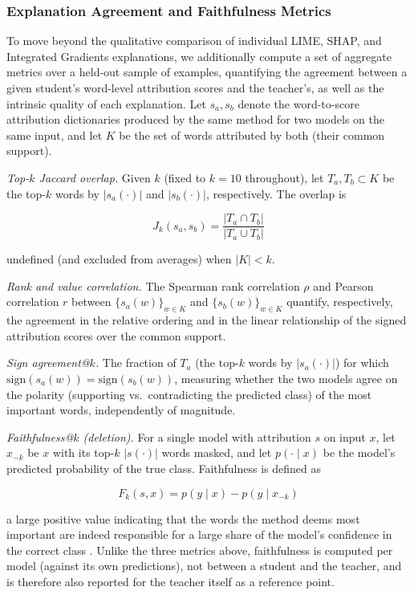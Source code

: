 \documentclass[conference]{IEEEtran}
\begin{document}
\subsubsection{Explanation Agreement and Faithfulness Metrics}\label{sec:xai-agreement-metrics}

To move beyond the qualitative comparison of individual LIME, SHAP, and Integrated Gradients explanations, we additionally compute a set of aggregate metrics over a held-out sample of examples, quantifying the agreement between a given student's word-level attribution scores and the teacher's, as well as the intrinsic quality of each explanation. Let $s_a,s_b$ denote the word-to-score attribution dictionaries produced by the same method for two models on the same input, and let $K$ be the set of words attributed by both (their common support).

\textit{Top-$k$ Jaccard overlap.} Given $k$ (fixed to $k=10$ throughout), let $T_a,T_b \subset K$ be the top-$k$ words by $|s_a(\cdot)|$ and $|s_b(\cdot)|$, respectively. The overlap is

\[
J_k(s_a,s_b) = \frac{|T_a \cap T_b|}{|T_a \cup T_b|}
\]

undefined (and excluded from averages) when $|K|<k$.

\textit{Rank and value correlation.} The Spearman rank correlation $\rho$ and Pearson correlation $r$ between $\{s_a(w)\}_{w \in K}$ and $\{s_b(w)\}_{w \in K}$ quantify, respectively, the agreement in the relative ordering and in the linear relationship of the signed attribution scores over the common support.

\textit{Sign agreement@$k$.} The fraction of $T_a$ (the top-$k$ words by $|s_a(\cdot)|$) for which $\mathrm{sign}(s_a(w)) = \mathrm{sign}(s_b(w))$, measuring whether the two models agree on the polarity (supporting vs.\ contradicting the predicted class) of the most important words, independently of magnitude.

\textit{Faithfulness@$k$ (deletion).} For a single model with attribution $s$ on input $x$, let $x_{-k}$ be $x$ with its top-$k$ $|s(\cdot)|$ words masked, and let $p(\cdot\mid x)$ be the model's predicted probability of the true class. Faithfulness is defined as

\[
F_k(s,x) = p(y\mid x) - p(y\mid x_{-k})
\]

a large positive value indicating that the words the method deems most important are indeed responsible for a large share of the model's confidence in the correct class \cite{deyoung2020eraser}. Unlike the three metrics above, faithfulness is computed per model (against its own predictions), not between a student and the teacher, and is therefore also reported for the teacher itself as a reference point.
\end{document}

